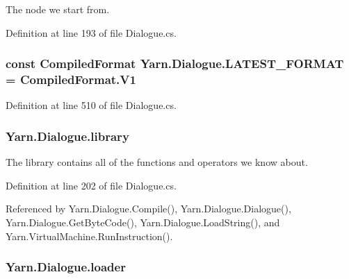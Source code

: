 The node we start from. 



Definition at line 193 of file Dialogue.\-cs.

\hypertarget{a00088_a3bc83587462ade6a2f7f42cb7576e50e}{
\subsubsection[{L\-A\-T\-E\-S\-T\-\_\-\-F\-O\-R\-M\-A\-T}]{\setlength{\rightskip}{0pt plus 5cm}const {\bf Compiled\-Format} Yarn.\-Dialogue.\-L\-A\-T\-E\-S\-T\-\_\-\-F\-O\-R\-M\-A\-T = Compiled\-Format.\-V1}}\label{a00088_a3bc83587462ade6a2f7f42cb7576e50e}


Definition at line 510 of file Dialogue.\-cs.

\hypertarget{a00088_ae660d4cfb6e296358d2f61d8ee74c66a}{
\subsubsection[{library}]{ Yarn.\-Dialogue.\-library}}\label{a00088_ae660d4cfb6e296358d2f61d8ee74c66a}


The library contains all of the functions and operators we know about. 



Definition at line 202 of file Dialogue.\-cs.



Referenced by Yarn.\-Dialogue.\-Compile(), Yarn.\-Dialogue.\-Dialogue(), Yarn.\-Dialogue.\-Get\-Byte\-Code(), Yarn.\-Dialogue.\-Load\-String(), and Yarn.\-Virtual\-Machine.\-Run\-Instruction().

\hypertarget{a00088_a98bbe0ac2ccadeeeb7e05e3e6e19f2e0}{
\subsubsection[{loader}]{ Yarn.\-Dialogue.\-loader\hspace{0.3cm}{\ttfamily [package]}}}\label{a00088_a98bbe0ac2ccadeeeb7e05e3e6e19f2e0}


